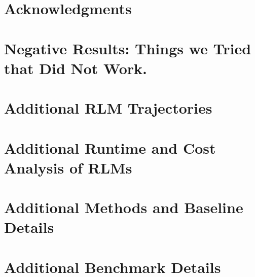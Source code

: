 \documentclass{article} %
\newcommand{\RLM}{RLM}
\begin{document}
\section*{Acknowledgments} \label{acknowledgments}





\newpage 

\appendix
\section{Negative Results: Things we Tried that Did Not Work.} \label{appx0:didnt-work}


\section{Additional \RLM{} Trajectories} \label{appx2:examples}


\newpage

\section{Additional Runtime and Cost Analysis of \RLM{}s} \label{appx1:runtime-cost}


\pagebreak

\section{Additional Methods and Baseline Details} \label{appx3:methods}


\section{Additional Benchmark Details} \label{appx4:benchmarks}

\end{document}
